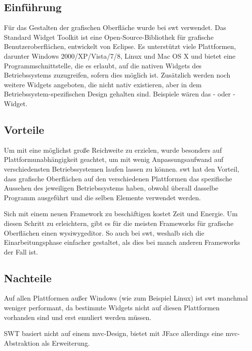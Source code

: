 \subsection{Einführung}
Für das Gestalten der grafischen Oberfläche wurde bei \sblit \acrshort{swt} verwendet.
Das Standard Widget Toolkit ist eine Open-Source-Bibliothek für grafische
Benutzeroberflächen, entwickelt von Eclipse. Es unterstützt viele Plattformen,
darunter Windows 2000/XP/Vista/7/8, Linux und Mac OS X und bietet eine
Programmschnittstelle, die es erlaubt, auf die nativen Widgets des
Betriebssystems zuzugreifen, sofern dies möglich ist. Zusätzlich werden noch
weitere Widgets angeboten, die nicht nativ existieren, aber in dem
Betriebssystem-spezifischen Design gehalten sind. Beispiele wären das -
oder -Widget.\cite{swt:tutorial}

\subsection{Vorteile}
\begin{description}
    Um mit \sblit eine möglichst große Reichweite zu erzielen, wurde
    besonders auf Plattformunabhängigkeit geachtet, um \sblit mit wenig
    Anpassungsaufwand auf verschiedensten Betriebssystemen laufen lassen zu können.
	\acrshort{swt} hat den Vorteil, dass grafische Oberflächen auf den verschiedenen Plattformen das
    spezifische Aussehen des jeweiligen Betriebssystems haben, obwohl überall dasselbe
    Programm ausgeführt und die selben Elemente verwendet werden.

    Sich mit einem neuen Framework zu beschäftigen kostet Zeit und Energie. Um
    diesen Schritt zu erleichtern, gibt es für die meisten Frameworks für grafische
    Oberflächen einen \gls{wysiwygeditor}. So auch bei \acrshort{swt}, weshalb
    sich die Einarbeitungsphase einfacher gestaltet, als dies bei manch anderen Frameworks
    der Fall ist.
\end{description}

\subsection{Nachteile}
\begin{description}
    Auf allen Plattformen außer Windows (wie zum Beispiel Linux) ist \acrshort{swt} manchmal
    weniger performant, da bestimmte Widgets nicht auf diesen Plattformen vorhanden sind und erst emuliert werden müssen.\cite{swt:disadvantages}

    SWT basiert nicht auf einem \acrshort{mvc}-Design, bietet mit JFace allerdings eine
    \acrshort{mvc}-Abstraktion als Erweiterung.\cite{swt:disadvantages}
\end{description}

